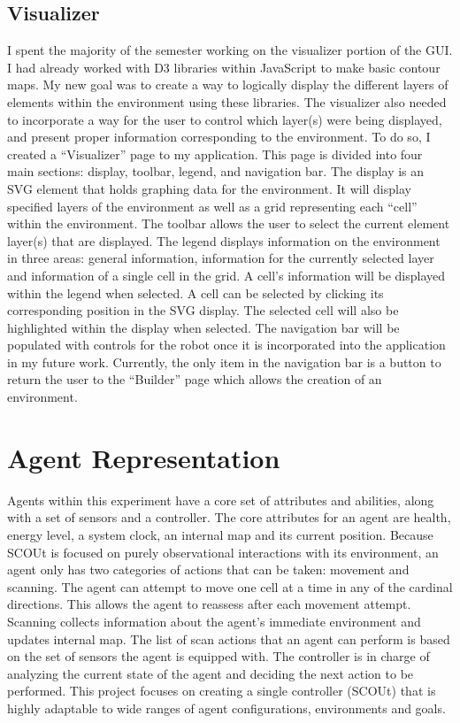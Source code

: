\subsection{Visualizer}
I spent the majority of the semester working on the visualizer portion of the GUI.
I had already worked with D3 libraries within JavaScript to make basic contour maps.
My new goal was to create a way to logically display the different layers of elements within the environment using these libraries.
The visualizer also needed to incorporate a way for the user to control which layer(s) were being displayed, and present proper information corresponding to the environment.
To do so, I created a “Visualizer” page to my application. This page is divided into four main sections: display, toolbar, legend, and navigation bar.
The display is an SVG element that holds graphing data for the environment.
It will display specified layers of the environment as well as a grid representing each “cell” within the environment.
The toolbar allows the user to select the current element layer(s) that are displayed.
The legend displays information on the environment in three areas: general information, information for the currently selected layer and information of a single cell in the grid.
A cell’s information will be displayed within the legend when selected.
A cell can be selected by clicking its corresponding position in the SVG display.
The selected cell will also be highlighted within the display when selected.
The navigation bar will be populated with controls for the robot once it is incorporated into the application in my future work.
Currently, the only item in the navigation bar is a button to return the user to the “Builder” page which allows the creation of an environment.


\section{Agent Representation}
Agents within this experiment have a core set of attributes and abilities, along with a set of sensors and a controller.
The core attributes for an agent are health, energy level, a system clock, an internal map and its current position.
Because SCOUt is focused on purely observational interactions with its environment, an agent only has two categories of actions that can be taken: movement and scanning.
The agent can attempt to move one cell at a time in any of the cardinal directions.
This allows the agent to reassess after each movement attempt.
Scanning collects information about the agent's immediate environment and updates internal map.
The list of scan actions that an agent can perform is based on the set of sensors the agent is equipped with.
The controller is in charge of analyzing the current state of the agent and deciding the next action to be performed.
This project focuses on creating a single controller (SCOUt) that is highly adaptable to wide ranges of agent configurations, environments and goals.

